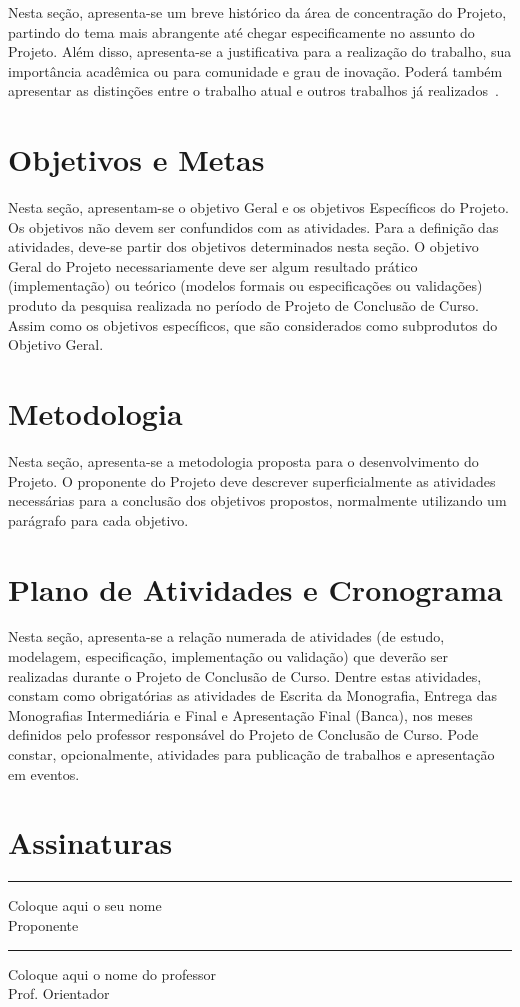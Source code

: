 \documentclass[tcc-proposta]{texifsap}
\begin{document}
Nesta seção, apresenta-se um breve histórico da área de concentração
do Projeto, partindo do tema mais abrangente até chegar
especificamente no assunto do Projeto. Além disso, apresenta-se a
justificativa para a realização do trabalho, sua importância acadêmica
ou para comunidade e grau de inovação. Poderá também apresentar as
distinções entre o trabalho atual e outros trabalhos já
realizados~\cite{vonNeumann:1966:TSR}.

\chapter{Objetivos e Metas}
Nesta seção, apresentam-se o objetivo Geral e os objetivos Específicos
do Projeto. Os objetivos não devem ser confundidos com as
atividades. Para a definição das atividades, deve-se partir dos
objetivos determinados nesta seção. O objetivo Geral do Projeto
necessariamente deve ser algum resultado prático (implementação) ou
teórico (modelos formais ou especificações ou validações) produto da
pesquisa realizada no período de Projeto de Conclusão de Curso. Assim
como os objetivos específicos, que são considerados como subprodutos
do Objetivo Geral.

\chapter{Metodologia}
Nesta seção, apresenta-se a metodologia proposta para o
desenvolvimento do Projeto. O proponente do Projeto deve descrever
superficialmente as atividades necessárias para a conclusão dos
objetivos propostos, normalmente utilizando um parágrafo para cada
objetivo.

\chapter{Plano de Atividades e Cronograma}

Nesta seção, apresenta-se a relação numerada de atividades (de estudo,
modelagem, especificação, implementação ou validação) que deverão ser
realizadas durante o Projeto de Conclusão de Curso. Dentre estas
atividades, constam como obrigatórias as atividades de Escrita da
Monografia, Entrega das Monografias Intermediária e Final e
Apresentação Final (Banca), nos meses definidos pelo professor
responsável do Projeto de Conclusão de Curso. Pode constar,
opcionalmente, atividades para publicação de trabalhos e apresentação
em eventos.




\chapter{Assinaturas}
\vspace{2cm}

\begin{center}
\rule{8cm}{.3mm}
\medskip

	Coloque aqui o seu nome\\
	Proponente

\end{center}

\vspace{4cm}

\begin{center}
\rule{8cm}{.3mm}
\medskip

	Coloque aqui o nome do professor\\
	Prof. Orientador

\end{center}
\end{document}
